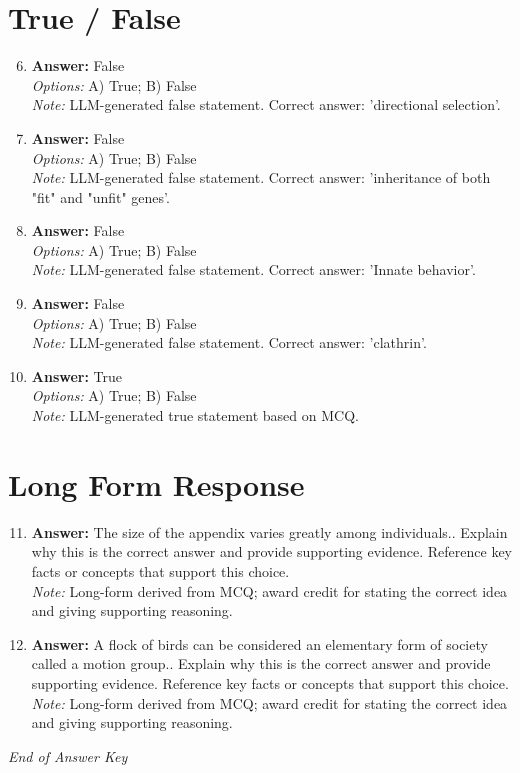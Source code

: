 \documentclass[12pt]{article}
\begin{document}
\section*{True / False}
\begin{enumerate}[label=\arabic*.]
\setcounter{enumi}{5}
\item \textbf{Answer:} False
\\ \textit{Options:} A) True; B) False
\\ \textit{Note:} LLM-generated false statement. Correct answer: 'directional selection'.
\item \textbf{Answer:} False
\\ \textit{Options:} A) True; B) False
\\ \textit{Note:} LLM-generated false statement. Correct answer: 'inheritance of both "fit" and "unfit" genes'.
\item \textbf{Answer:} False
\\ \textit{Options:} A) True; B) False
\\ \textit{Note:} LLM-generated false statement. Correct answer: 'Innate behavior'.
\item \textbf{Answer:} False
\\ \textit{Options:} A) True; B) False
\\ \textit{Note:} LLM-generated false statement. Correct answer: 'clathrin'.
\item \textbf{Answer:} True
\\ \textit{Options:} A) True; B) False
\\ \textit{Note:} LLM-generated true statement based on MCQ.
\end{enumerate}

\section*{Long Form Response}
\begin{enumerate}[label=\arabic*.]
\setcounter{enumi}{10}
\item \textbf{Answer:} The size of the appendix varies greatly among individuals.. Explain why this is the correct answer and provide supporting evidence. Reference key facts or concepts that support this choice.
\\ \textit{Note:} Long-form derived from MCQ; award credit for stating the correct idea and giving supporting reasoning.
\item \textbf{Answer:} A flock of birds can be considered an elementary form of society called a motion group.. Explain why this is the correct answer and provide supporting evidence. Reference key facts or concepts that support this choice.
\\ \textit{Note:} Long-form derived from MCQ; award credit for stating the correct idea and giving supporting reasoning.
\end{enumerate}

\vfill
\noindent\textit{End of Answer Key}
\end{document}
